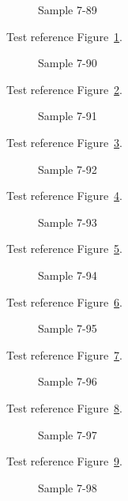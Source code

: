 \begin{figure}[tbhp]
\caption{Sample 7-89}
\label{fig:sample-7-89}
\end{figure}

Test reference Figure~\ref{fig:sample-7-89}.

\begin{figure}[tbhp]
\caption{Sample 7-90}
\label{fig:sample-7-90}
\end{figure}

Test reference Figure~\ref{fig:sample-7-90}.

\begin{figure}[tbhp]
\caption{Sample 7-91}
\label{fig:sample-7-91}
\end{figure}

Test reference Figure~\ref{fig:sample-7-91}.

\begin{figure}[tbhp]
\caption{Sample 7-92}
\label{fig:sample-7-92}
\end{figure}

Test reference Figure~\ref{fig:sample-7-92}.

\begin{figure}[tbhp]
\caption{Sample 7-93}
\label{fig:sample-7-93}
\end{figure}

Test reference Figure~\ref{fig:sample-7-93}.

\begin{figure}[tbhp]
\caption{Sample 7-94}
\label{fig:sample-7-94}
\end{figure}

Test reference Figure~\ref{fig:sample-7-94}.

\begin{figure}[tbhp]
\caption{Sample 7-95}
\label{fig:sample-7-95}
\end{figure}

Test reference Figure~\ref{fig:sample-7-95}.

\begin{figure}[tbhp]
\caption{Sample 7-96}
\label{fig:sample-7-96}
\end{figure}

Test reference Figure~\ref{fig:sample-7-96}.

\begin{figure}[tbhp]
\caption{Sample 7-97}
\label{fig:sample-7-97}
\end{figure}

Test reference Figure~\ref{fig:sample-7-97}.

\begin{figure}[tbhp]
\caption{Sample 7-98}
\label{fig:sample-7-98}
\end{figure}

